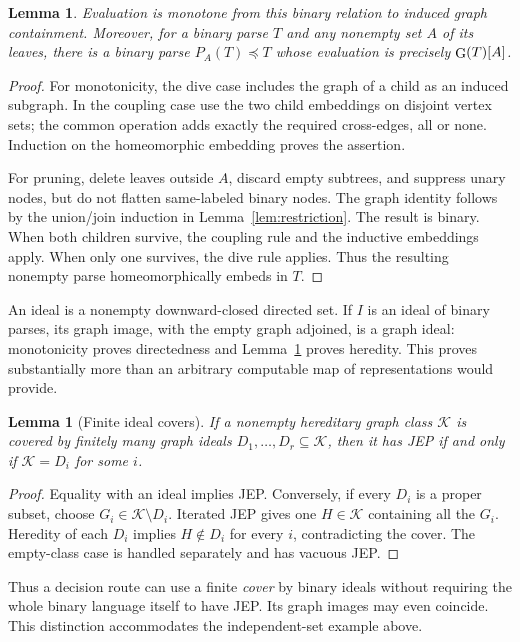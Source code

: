 \documentclass[11pt]{article}
\newtheorem{lemma}[theorem]{Lemma}
\newcommand{\ev}{\mathop{\rm G}}
\begin{document}
\begin{lemma}\label{lem:binary-pruning}
Evaluation is monotone from this binary relation to induced graph
containment. Moreover, for a binary parse $T$ and any nonempty set $A$
of its leaves, there is a binary parse $P_A(T)\preceq T$ whose evaluation
is precisely $\ev(T)[A]$.
\end{lemma}
\begin{proof}
For monotonicity, the dive case includes the graph of a child as an
induced subgraph. In the coupling case use the two child embeddings on
disjoint vertex sets; the common operation adds exactly the required
cross-edges, all or none. Induction on the homeomorphic embedding proves
the assertion.

For pruning, delete leaves outside $A$, discard empty subtrees, and
suppress unary nodes, but do not flatten same-labeled binary nodes.
The graph identity follows by the union/join induction in
Lemma~\ref{lem:restriction}. The result is binary. When both children
survive, the coupling rule and the inductive embeddings apply. When
only one survives, the dive rule applies. Thus the resulting nonempty
parse homeomorphically embeds in $T$.
\end{proof}

An ideal is a nonempty downward-closed directed set. If $I$ is an ideal
of binary parses, its graph image, with the empty graph adjoined, is a
graph ideal: monotonicity proves directedness and
Lemma~\ref{lem:binary-pruning} proves heredity. This proves substantially
more than an arbitrary computable map of representations would provide.

\begin{lemma}[Finite ideal covers]\label{lem:cover}
If a nonempty hereditary graph class $\mathcal K$ is covered by finitely many
graph ideals $D_1,\ldots,D_r\subseteq\mathcal K$, then it has JEP if
and only if $\mathcal K=D_i$ for some $i$.
\end{lemma}
\begin{proof}
Equality with an ideal implies JEP. Conversely, if every $D_i$ is a
proper subset, choose $G_i\in\mathcal K\setminus D_i$. Iterated JEP
gives one $H\in\mathcal K$ containing all the $G_i$. Heredity of each
$D_i$ implies $H\notin D_i$ for every $i$, contradicting the cover.
The empty-class case is handled separately and has vacuous JEP.
\end{proof}

Thus a decision route can use a finite \emph{cover} by binary ideals
without requiring the whole binary language itself to have JEP. Its
graph images may even coincide. This distinction accommodates the
independent-set example above.
\end{document}
